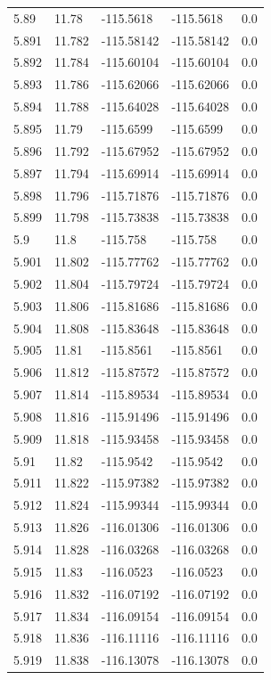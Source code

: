 \begin{tabular}{lllll}
5.89 & 11.78 & -115.5618 & -115.5618 & 0.0 \\
5.891 & 11.782 & -115.58142 & -115.58142 & 0.0 \\
5.892 & 11.784 & -115.60104 & -115.60104 & 0.0 \\
5.893 & 11.786 & -115.62066 & -115.62066 & 0.0 \\
5.894 & 11.788 & -115.64028 & -115.64028 & 0.0 \\
5.895 & 11.79 & -115.6599 & -115.6599 & 0.0 \\
5.896 & 11.792 & -115.67952 & -115.67952 & 0.0 \\
5.897 & 11.794 & -115.69914 & -115.69914 & 0.0 \\
5.898 & 11.796 & -115.71876 & -115.71876 & 0.0 \\
5.899 & 11.798 & -115.73838 & -115.73838 & 0.0 \\
5.9 & 11.8 & -115.758 & -115.758 & 0.0 \\
5.901 & 11.802 & -115.77762 & -115.77762 & 0.0 \\
5.902 & 11.804 & -115.79724 & -115.79724 & 0.0 \\
5.903 & 11.806 & -115.81686 & -115.81686 & 0.0 \\
5.904 & 11.808 & -115.83648 & -115.83648 & 0.0 \\
5.905 & 11.81 & -115.8561 & -115.8561 & 0.0 \\
5.906 & 11.812 & -115.87572 & -115.87572 & 0.0 \\
5.907 & 11.814 & -115.89534 & -115.89534 & 0.0 \\
5.908 & 11.816 & -115.91496 & -115.91496 & 0.0 \\
5.909 & 11.818 & -115.93458 & -115.93458 & 0.0 \\
5.91 & 11.82 & -115.9542 & -115.9542 & 0.0 \\
5.911 & 11.822 & -115.97382 & -115.97382 & 0.0 \\
5.912 & 11.824 & -115.99344 & -115.99344 & 0.0 \\
5.913 & 11.826 & -116.01306 & -116.01306 & 0.0 \\
5.914 & 11.828 & -116.03268 & -116.03268 & 0.0 \\
5.915 & 11.83 & -116.0523 & -116.0523 & 0.0 \\
5.916 & 11.832 & -116.07192 & -116.07192 & 0.0 \\
5.917 & 11.834 & -116.09154 & -116.09154 & 0.0 \\
5.918 & 11.836 & -116.11116 & -116.11116 & 0.0 \\
5.919 & 11.838 & -116.13078 & -116.13078 & 0.0 \\

\end{tabular}

